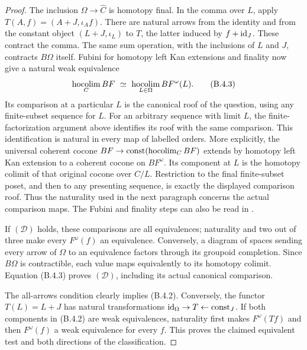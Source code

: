 \begin{proof}
The inclusion $\Omega\to\widehat C$ is homotopy final. In the
comma over $L$, apply $T(A,f)=(A+J,\iota_A f)$. There are natural
arrows from the identity and from the constant object
$(L+J,\iota_L)$ to $T$, the latter induced by $f+\mathrm{id}_J$.
These contract the comma. The same sum operation, with the
inclusions of $L$ and $J$, contracts $B\Omega$ itself. Fubini
for homotopy left Kan extensions and finality now give a natural
weak equivalence
\[
 \hocolim_C BF\ \simeq\ \hocolim_{L\in\Omega}BF^\omega(L).
 \tag{B.4.3}
\]
Its comparison at a particular $L$ is the canonical roof of
the question, using any finite-subset sequence for $L$. For an
arbitrary sequence with limit $L$, the finite-factorization
argument above identifies its roof with the same comparison.
This identification is natural in every map of labelled orders.
More explicitly, the universal coherent cocone
$BF\to\mathrm{const}(\operatorname*{hocolim}_C BF)$ extends by homotopy left
Kan extension to a coherent cocone on $BF^\omega$. Its component
at $L$ is the homotopy colimit of that original cocone over
$C/L$. Restriction to the final finite-subset poset, and then
to any presenting sequence, is exactly the displayed comparison
roof. Thus the naturality used in the next paragraph concerns
the actual comparison maps. The Fubini and finality steps can
also be read in \cite[Theorems 24.9, 26.8, 30.5]{FChacholskiScherer2001}.

If $(\mathcal D)$ holds, these comparisons are all equivalences;
naturality and two out of three make every $F^\omega(f)$ an
equivalence. Conversely, a diagram of spaces sending every arrow
of $\Omega$ to an equivalence factors through its groupoid
completion. Since $B\Omega$ is contractible, each value maps
equivalently to its homotopy colimit. Equation (B.4.3) proves
$(\mathcal D)$, including its actual canonical comparison.

The all-arrows condition clearly implies (B.4.2). Conversely,
the functor $T(L)=L+J$ has natural transformations
$\mathrm{id}_\Omega\to T\leftarrow\mathrm{const}_J$.
If both components in (B.4.2) are weak equivalences, naturality
first makes $F^\omega(Tf)$ and then $F^\omega(f)$ a weak
equivalence for every $f$. This proves the claimed equivalent
test and both directions of the classification.
\end{proof}

